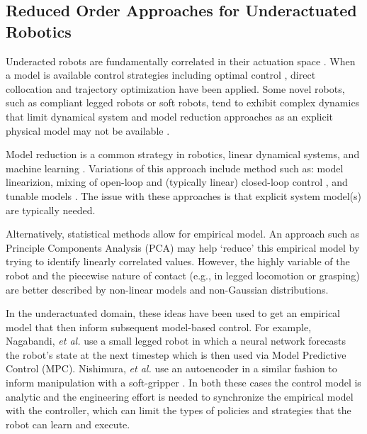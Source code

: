 \documentclass[letterpaper, 10 pt, conference]{ieeeconf}
\begin{document}



\subsection{Reduced Order Approaches for Underactuated Robotics}

Underacted robots are fundamentally correlated in their actuation space  \cite{tedrake2009underactuated}.
When a model is available control strategies including optimal control \cite{betts2010practical}, direct collocation \cite{von1993numerical} and trajectory optimization \cite{kalakrishnan2011stomp} have been applied.
Some novel robots, such as compliant legged robots or soft robots, tend to exhibit complex dynamics that limit dynamical system and model reduction approaches as an explicit physical model may not be available \cite{nakajima2015information}.

Model reduction is a common strategy in robotics, linear dynamical systems, and machine learning \cite{betts2010practical, sutton1998reinforcement}.   Variations of this approach include method such as: model linearizion, mixing of open-loop and (typically linear) closed-loop control \cite{kolter2010probabilistic}, and tunable models \cite{maeda2011tuned}.  The issue with these approaches is that explicit system model(s) are typically needed.  

Alternatively, statistical methods allow for empirical model.
An approach such as Principle Components Analysis (PCA) may help `reduce' this empirical model by trying to identify linearly correlated values.
However, the highly variable of the robot and the piecewise nature of contact (e.g., in legged locomotion or grasping) are better described by non-linear models and non-Gaussian distributions.  

In the underactuated domain, these ideas have been used to get an empirical model that then inform subsequent model-based control.  For example, Nagabandi, \emph{et al.} \cite{nagabandi2018learning} use a small legged robot in which a neural network forecasts the robot's state at the next timestep which is then used via Model Predictive Control (MPC).  Nishimura, \emph{et al.} use an autoencoder in a similar fashion to inform manipulation with a soft-gripper \cite{nishimura2017thin}.  In both these cases the control model is analytic and the engineering effort is needed to synchronize the empirical model with the controller, which can limit the types of policies and strategies that the robot can learn and execute.
\end{document}
